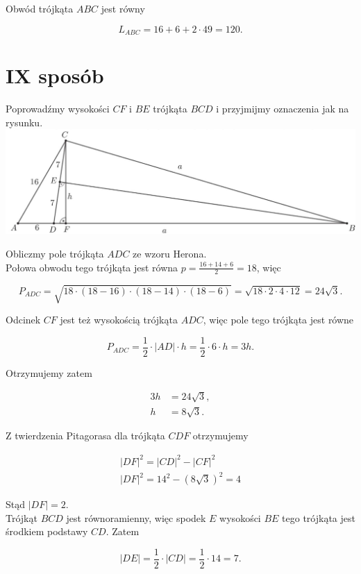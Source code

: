 \documentclass[10pt]{article}
\begin{document}
Obwód trójkąta $A B C$ jest równy

$$
L_{A B C}=16+6+2 \cdot 49=120 .
$$

\section*{IX sposób}
Poprowadźmy wysokości $C F$ i $B E$ trójkąta $B C D$ i przyjmijmy oznaczenia jak na rysunku.\\
\includegraphics[max width=\textwidth, center]{2025_02_07_d712b9a47aa2c64928dbg-31}

Obliczmy pole trójkąta $A D C$ ze wzoru Herona.\\
Połowa obwodu tego trójkąta jest równa $p=\frac{16+14+6}{2}=18$, więc

$$
P_{A D C}=\sqrt{18 \cdot(18-16) \cdot(18-14) \cdot(18-6)}=\sqrt{18 \cdot 2 \cdot 4 \cdot 12}=24 \sqrt{3} .
$$

Odcinek $C F$ jest też wysokością trójkąta $A D C$, więc pole tego trójkąta jest równe

$$
P_{A D C}=\frac{1}{2} \cdot|A D| \cdot h=\frac{1}{2} \cdot 6 \cdot h=3 h .
$$

Otrzymujemy zatem

$$
\begin{aligned}
3 h & =24 \sqrt{3}, \\
h & =8 \sqrt{3} .
\end{aligned}
$$

Z twierdzenia Pitagorasa dla trójkąta $C D F$ otrzymujemy

$$
\begin{gathered}
|D F|^{2}=|C D|^{2}-|C F|^{2} \\
|D F|^{2}=14^{2}-(8 \sqrt{3})^{2}=4
\end{gathered}
$$

Stąd $|D F|=2$.\\
Trójkąt $B C D$ jest równoramienny, więc spodek $E$ wysokości $B E$ tego trójkąta jest środkiem podstawy $C D$. Zatem

$$
|D E|=\frac{1}{2} \cdot|C D|=\frac{1}{2} \cdot 14=7 .
$$
\end{document}
